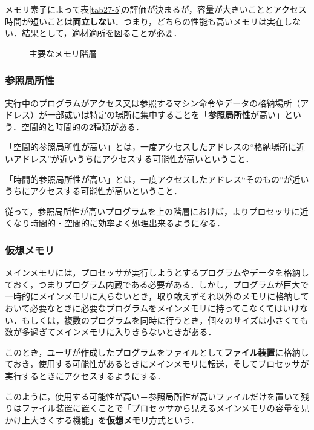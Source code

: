 メモリ素子によって表\ref{tab27-5}の評価が決まるが，容量が大きいこととアクセス時間が短いことは\textbf{両立しない}．つまり，どちらの性能も高いメモリは実在しない．結果として，適材適所を図ることが必要．

\begin{figure}[H]
	\begin{center}
		\caption{主要なメモリ階層}
		\label{fig14-6}
	\end{center}
\end{figure}



\subsubsection{参照局所性}

実行中のプログラムがアクセス又は参照するマシン命令やデータの格納場所（アドレス）が一部或いは特定の場所に集中することを「\textbf{参照局所性}が高い」という．空間的と時間的の2種類がある．
\begin{enumerate}[label=\textbf{[\arabic*]}, labelsep=10pt, leftmargin=23pt]
	\item 「空間的参照局所性が高い」とは，一度アクセスしたアドレスの“格納場所に近いアドレス”が近いうちにアクセスする可能性が高いということ．
	\item 「時間的参照局所性が高い」とは，一度アクセスしたアドレス“そのもの”が近いうちにアクセスする可能性が高いということ．
\end{enumerate}

従って，参照局所性が高いプログラムを上の階層におけば，よりプロセッサに近くなり時間的・空間的に効率よく処理出来るようになる．



\subsubsection{仮想メモリ}

メインメモリには，プロセッサが実行しようとするプログラムやデータを格納しておく，つまりプログラム内蔵である必要がある．しかし，プログラムが巨大で一時的にメインメモリに入らないとき，取り敢えずそれ以外のメモリに格納しておいて必要なときに必要なプログラムをメインメモリに持ってこなくてはいけない．もしくは，複数のプログラムを同時に行うとき，個々のサイズは小さくても数が多過ぎてメインメモリに入りきらないときがある．

このとき，ユーザが作成したプログラムをファイルとして\textbf{ファイル装置}に格納しておき，使用する可能性があるときにメインメモリに転送，そしてプロセッサが実行するときにアクセスするようにする．

このように，使用する可能性が高い＝参照局所性が高いファイルだけを置いて残りはファイル装置に置くことで「プロセッサから見えるメインメモリの容量を見かけ上大きくする機能」を\textbf{仮想メモリ}方式という．